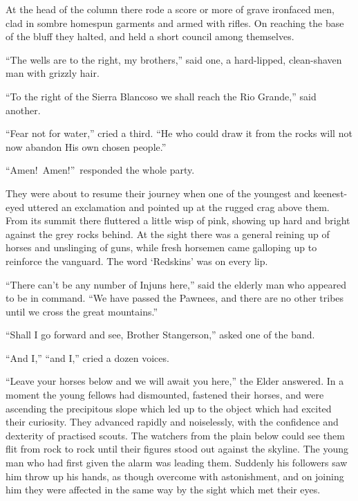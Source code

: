 \documentclass[12pt,english]{book}
\begin{document}
At the head of the column there rode a score or more of grave ironfaced
men, clad in sombre homespun garments and armed with rifles. On reaching
the base of the bluff they halted, and held a short council among
themselves.

{}``The wells are to the right, my brothers,'' said one, a hard-lipped,
clean-shaven man with grizzly hair.

{}``To the right of the Sierra Blanco\mdsh{---}so we shall reach
the Rio Grande,'' said another.

{}``Fear not for water,'' cried a third. {}``He who could draw
it from the rocks will not now abandon His own chosen people.''

{}``Amen!\ Amen!''\ responded the whole party.

They were about to resume their journey when one of the youngest and
keenest-eyed uttered an exclamation and pointed up at the rugged crag
above them. From its summit there fluttered a little wisp of pink,
showing up hard and bright against the grey rocks behind. At the sight
there was a general reining up of horses and unslinging of guns, while
fresh horsemen came galloping up to reinforce the vanguard. The word
`Redskins' was on every lip.

{}``There can't be any number of Injuns here,'' said the elderly
man who appeared to be in command. {}``We have passed the Pawnees,
and there are no other tribes until we cross the great mountains.''

{}``Shall I go forward and see, Brother Stangerson,'' asked one
of the band.

{}``And I,'' {}``and I,'' cried a dozen voices.

{}``Leave your horses below and we will await you here,'' the Elder
answered. In a moment the young fellows had dismounted, fastened their
horses, and were ascending the precipitous slope which led up to the
object which had excited their curiosity. They advanced rapidly and
noiselessly, with the confidence and dexterity of practised scouts.
The watchers from the plain below could see them flit from rock to
rock until their figures stood out against the skyline. The young
man who had first given the alarm was leading them. Suddenly his followers
saw him throw up his hands, as though overcome with astonishment,
and on joining him they were affected in the same way by the sight
which met their eyes.
\end{document}
